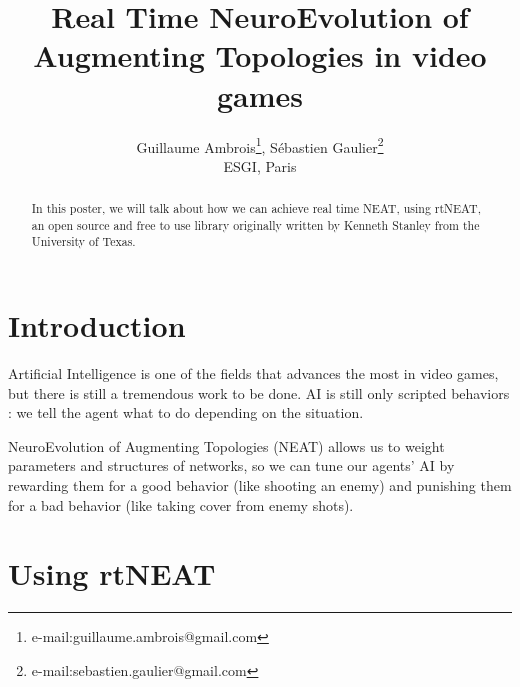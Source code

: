 \documentclass[conference]{acmsiggraph}
\title{Real Time NeuroEvolution of Augmenting Topologies in video games}
\author{Guillaume Ambrois\thanks{e-mail:guillaume.ambrois@gmail.com}, Sébastien Gaulier\thanks{e-mail:sebastien.gaulier@gmail.com}\\ESGI, Paris}
\begin{document}


\maketitle

\begin{abstract}

In this poster, we will talk about how we can achieve real time NEAT, using rtNEAT, an open source and free to use library originally written by Kenneth Stanley from the University of Texas.

\end{abstract}

\keywordlist


\copyrightspace

\section{Introduction}

Artificial Intelligence is one of the fields that advances the most in video games, but there is still a tremendous work to be done. AI is still only scripted behaviors : we tell the agent what to do depending on the situation.

NeuroEvolution of Augmenting Topologies (NEAT) allows us to weight parameters and structures of networks, so we can tune our agents' AI by rewarding them for a good behavior (like shooting an enemy) and punishing them for a bad behavior (like taking cover from enemy shots).

\section{Using rtNEAT}
\end{document}
